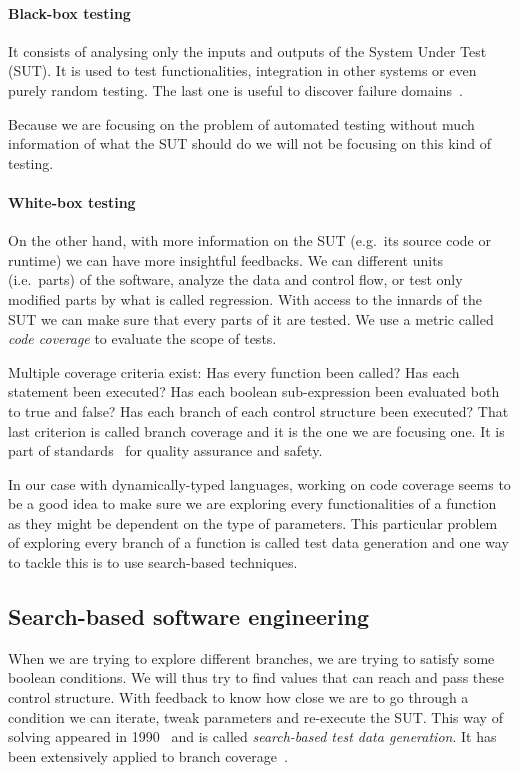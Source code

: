 \documentclass{llncs2e/llncs}
\begin{document}
\paragraph{Black-box testing} It consists of analysing only the inputs and
outputs of the System Under Test (SUT). It is used to test functionalities,
integration in other systems or even purely random testing. The last one is
useful to discover failure domains~\cite{ahmad2014new}.

Because we are focusing on the problem of automated testing without much
information of what the SUT should do we will not be focusing on this kind of
testing.

\paragraph{White-box testing} On the other hand, with more information on the
SUT (e.g.\ its source code or runtime) we can have more insightful feedbacks. We
can different units (i.e.\ parts) of the software, analyze the data and control
flow, or test only modified parts by what is called regression. With access to
the innards of the SUT we can make sure that every parts of it are tested. We
use a metric called \textit{code coverage} to evaluate the scope of tests.

Multiple coverage criteria exist: Has every function been called? Has each
statement been executed? Has each boolean sub-expression been evaluated both to
true and false? Has each branch of each control structure been executed? That
last criterion is called branch coverage and it is the one we are focusing one.
It is part of standards~\cite{BSI98,RTCA92} for quality assurance and safety.

In our case with dynamically-typed languages, working on code coverage seems to
be a good idea to make sure we are exploring every functionalities of a function
as they might be dependent on the type of parameters. This particular problem of
exploring every branch of a function is called test data generation and one way
to tackle this is to use search-based techniques.

\subsection{Search-based software engineering}
\label{sbse}

When we are trying to explore different branches, we are trying to satisfy some
boolean conditions. We will thus try to find values that can reach and pass
these control structure. With feedback to know how close we are to go through a
condition we can iterate, tweak parameters and re-execute the SUT\@. This way of
solving appeared in 1990~\cite{korel1990automated} and is called
\textit{search-based test data generation}. It has been extensively applied to
branch coverage~\cite{mcminn2004search,lakhotia2007multi,mcminn2007iguana}.
\end{document}
